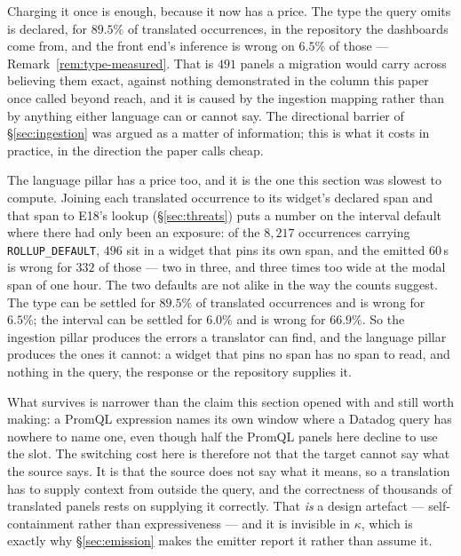 Charging it once is enough, because it now has a price. The type the query omits is
declared, for $89.5\%$ of translated occurrences, in the repository the dashboards come
from, and the front end's inference is wrong on $6.5\%$ of those ---
Remark~\ref{rem:type-measured}. That is $491$ panels a migration would carry across
believing them exact, against nothing demonstrated in the column this paper once called
beyond reach, and it is caused by the ingestion mapping rather than by anything either language
can or cannot say. The directional barrier of \S\ref{sec:ingestion} was argued as a matter of
information; this is what it costs in practice, in the direction the paper calls
cheap.

The language pillar has a price too, and it is the one this section was slowest to
compute. Joining each translated occurrence to its widget's declared span and that span
to E18's lookup (\S\ref{sec:threats}) puts a number on the interval default where there
had only been an exposure: of the $8{,}217$ occurrences carrying
\texttt{ROLLUP\_DEFAULT}, $496$ sit in a widget that pins its own span, and the emitted
$60$\,s is wrong for $332$ of those --- two in three, and three times too wide at the
modal span of one hour. The two defaults are not alike in the way the counts suggest.
The type can be settled for $89.5\%$ of translated occurrences and is wrong for $6.5\%$;
the interval can be settled for $6.0\%$ and is wrong for $66.9\%$. So the ingestion
pillar produces the errors a translator can find, and the language pillar produces the
ones it cannot: a widget that pins no span has no span to read, and nothing in the query,
the response or the repository supplies it.

What survives is narrower than the claim this section opened with and still worth
making: a PromQL expression names its own window where a Datadog query has nowhere to
name one, even though half the PromQL panels here decline to use the slot. The switching cost here is therefore not that the target cannot say what the source
says. It is that the source does not say what it means, so a translation has to supply
context from outside the query, and the correctness of thousands of translated panels
rests on supplying it correctly. That \emph{is} a design artefact --- self-containment
rather than expressiveness --- and it is invisible in $\kappa$, which is exactly why
\S\ref{sec:emission} makes the emitter report it rather than assume it.

